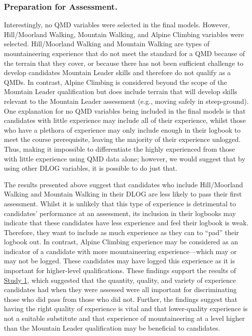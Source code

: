 \documentclass[
  12pt,
  a4paper,
]{book}
\begin{document}
\hypertarget{study-4-preparation-for-assessment}{%
\subsubsection{Preparation for Assessment.}\label{study-4-preparation-for-assessment}}

Interestingly, no QMD variables were selected in the final models. However, Hill/Moorland Walking, Mountain Walking, and Alpine Climbing variables were selected. Hill/Moorland Walking and Mountain Walking are types of mountaineering experience that do not meet the standard for a QMD because of the terrain that they cover, or because there has not been sufficient challenge to develop candidates Mountain Leader skills and therefore do not qualify as a QMDs. In contrast, Alpine Climbing is considered beyond the scope of the Mountain Leader qualification but does include terrain that will develop skills relevant to the Mountain Leader assessment (e.g., moving safely in steep-ground). One explanation for no QMD variables being included in the final models is that candidates with little experience may include all of their experience, whilst those who have a plethora of experience may only include enough in their logbook to meet the course prerequisite, leaving the majority of their experience unlogged. Thus, making it impossible to differentiate the highly experienced from those with little experience using QMD data alone; however, we would suggest that by using other DLOG variables, it is possible to do just that.

The results presented above suggest that candidates who include Hill/Moorland Walking and Mountain Walking in their DLOG are less likely to pass their first assessment. Whilst it is unlikely that this type of experience is detrimental to candidates' performance at an assessment, its inclusion in their logbooks may indicate that these candidates have less experience and feel their logbook is weak. Therefore, they want to include as much experience as they can to ``pad'' their logbook out. In contrast, Alpine Climbing experience may be considered as an indicator of a candidate with more mountaineering experience---which may or may not be logged. These candidates may have logged this experience as it is important for higher-level qualifications. These findings support the results of \protect\hyperlink{ml-qualitative}{Study 1}, which suggested that the quantity, quality, and variety of experience candidates had when they were assessed were all important for discriminating those who did pass from those who did not. Further, the findings suggest that having the right quality of experience is vital and that lower-quality experience is not a suitable substitute and that experience of mountaineering at a level higher than the Mountain Leader qualification may be beneficial to candidates.
\end{document}
